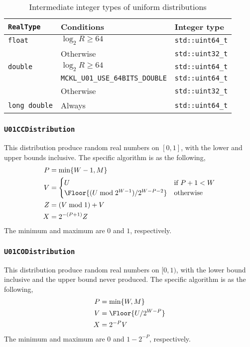 \begin{table}
  \begin{tabularx}{\textwidth}{LlL}
    \toprule
    \verb|RealType| & Conditions & Integer type \\
    \midrule
    \verb|float| & $\log_2 R \ge 64$ & \verb|std::uint64_t| \\
                 & Otherwise         & \verb|std::uint32_t| \\
    \verb|double| & $\log_2 R \ge 64$ & \verb|std::uint64_t| \\
    & \verb|MCKL_U01_USE_64BITS_DOUBLE| & \verb|std::uint64_t| \\
    & Otherwise & \verb|std::uint32_t| \\
    \verb|long double| & Always & \verb|std::uint64_t| \\
    \bottomrule
  \end{tabularx}
  \caption{Intermediate integer types of uniform distributions}
  \label{tab:Intermediate integer types of uniform distributions}
\end{table}

\subsubsection{\texttt{U01CCDistribution}}

This distribution produce random real numbers on $[0, 1]$, with the lower and
upper bounds inclusive. The specific algorithm is as the following,
\begin{align*}
  P &= \min\{W - 1, M\} \\
  V &= \begin{cases}
    U &\text{if } P + 1 < W \\
    \Floor{(U \bmod 2^{W - 1}) / 2^{W - P -2}} &\text{otherwise}
  \end{cases} \\
  Z &= (V \bmod 1) + V \\
  X &= 2^{-(P + 1)} Z
\end{align*}
The minimum and maximum are $0$ and $1$, respectively.

\subsubsection{\texttt{U01CODistribution}}

This distribution produce random real numbers on $[0, 1)$, with the lower bound
inclusive and the upper bound never produced. The specific algorithm is as the
following,
\begin{align*}
  P &= \min\{W, M\} \\
  V &= \Floor{U / 2^{W - P}} \\
  X &= 2^{-P} V
\end{align*}
The minimum and maximum are $0$ and $1 - 2^{-P}$, respectively.

